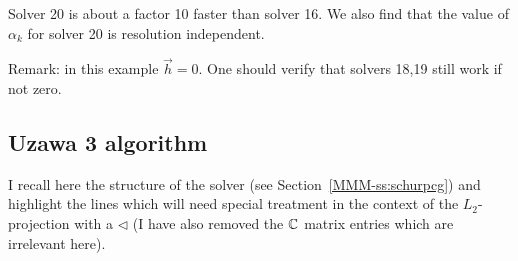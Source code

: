 Solver 20 is about a factor 10 faster than solver 16.
We also find that the value of $\alpha_k$ for solver 20 is resolution independent.

Remark: in this example $\vec{h}=0$. One should verify that solvers 18,19 still work if not zero.

\subsection*{Uzawa 3 algorithm}

I recall here the structure of the solver (see Section~\ref{MMM-ss:schurpcg})
and highlight the lines which will need special treatment in the context of the $L_2$-projection
with a $\triangleleft$ (I have also removed the ${\mathbb{C}}$ matrix entries which are irrelevant here).

